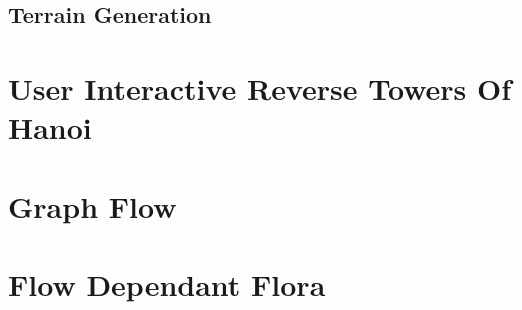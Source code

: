 \subsection{Terrain Generation}

\section{User Interactive Reverse Towers Of Hanoi}
\lipsum[1-1] \cite{parikh1980adaptive}

\section{Graph Flow}

\section{Flow Dependant Flora}
\lipsum[1-1] \cite{parikh1980adaptive}